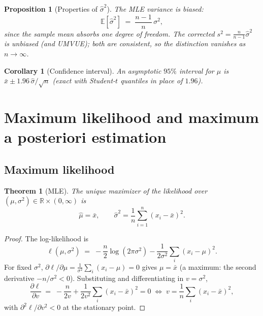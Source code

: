 \documentclass[11pt]{article}
\newtheorem{theorem}{Theorem}
\newtheorem{proposition}{Proposition}
\newtheorem{corollary}{Corollary}
\theoremstyle{remark}
\newcommand{\E}{\mathbb{E}}
\newcommand{\xbar}{\bar{x}}
\begin{document}
\begin{proposition}[Properties of $\hat\sigma^2$]
\label{prop:sighat}
The MLE variance is \emph{biased}:
\begin{equation}
  \E[\hat\sigma^2] \;=\; \frac{n-1}{n}\,\sigma^2,
  \label{eq:bias}
\end{equation}
since the sample mean absorbs one degree of freedom. The corrected
$s^2 = \tfrac{n}{n-1}\hat\sigma^2$ is unbiased (and UMVUE); both are
consistent, so the distinction vanishes as $n \to \infty$.
\end{proposition}

\begin{corollary}[Confidence interval]
An asymptotic $95\%$ interval for $\mu$ is
$\xbar \pm 1.96\, \hat\sigma/\sqrt{n}$ (exact with Student-$t$
quantiles in place of $1.96$).
\end{corollary}

\section{Maximum likelihood and maximum a posteriori estimation}

\subsection{Maximum likelihood}

\begin{theorem}[MLE]
\label{thm:mle}
The unique maximizer of the likelihood over
$(\mu, \sigma^2) \in \mathbb{R} \times (0, \infty)$ is
\begin{equation}
  \boxed{\;\hat\mu = \xbar, \qquad
  \hat\sigma^2 = \frac1n \sum_{i=1}^{n} (x_i - \xbar)^2.\;}
  \label{eq:mle}
\end{equation}
\end{theorem}

\begin{proof}
The log-likelihood is
\begin{equation}
  \ell(\mu, \sigma^2)
  \;=\; -\frac{n}{2}\log(2\pi\sigma^2)
        - \frac{1}{2\sigma^2}\sum_i (x_i - \mu)^2.
  \label{eq:loglik}
\end{equation}
For fixed $\sigma^2$, $\partial\ell/\partial\mu =
\tfrac{1}{\sigma^2}\sum_i (x_i - \mu) = 0$ gives $\mu = \xbar$
(a maximum: the second derivative $-n/\sigma^2 < 0$). Substituting
and differentiating in $v = \sigma^2$,
\begin{equation*}
  \frac{\partial \ell}{\partial v}
  \;=\; -\frac{n}{2v} + \frac{1}{2v^2}\sum_i (x_i - \xbar)^2 = 0
  \;\Longleftrightarrow\;
  v = \frac1n \sum_i (x_i - \xbar)^2,
\end{equation*}
with $\partial^2 \ell/\partial v^2 < 0$ at the stationary point.
\end{proof}
\end{document}
